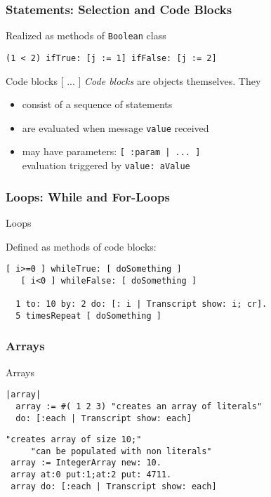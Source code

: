 \documentclass{beamer}
\newcommand{\Blue}[1]{\color{blue}#1\color{black}}
\begin{document}
\begin{frame}[fragile]
\frametitle{Statements: Selection and Code Blocks}

Realized as methods of \texttt{Boolean} class

\begin{lstlisting}[language=Smalltalk]
  (1 < 2) ifTrue: [j := 1] ifFalse: [j := 2]
\end{lstlisting} 

\pause\medskip

\begin{block}{Code blocks [ ... ]}
\emph{Code blocks} are objects themselves. They
\begin{itemize}
  \item consist of a sequence of statements
  \item are evaluated when message \texttt{value} received
  \item may have parameters: 
    \lstinline[language=Smalltalk]{[ :param | ... ]} \\
    evaluation triggered by \texttt{value: aValue}
\end{itemize}

\end{block}


\end{frame}


\begin{frame}[fragile]
\frametitle{Loops: While and For-Loops}

\Blue{Loops}\medskip

Defined as methods of code blocks:

\begin{lstlisting}[language=Smalltalk]
   [ i>=0 ] whileTrue: [ doSomething ]
   [ i<0 ] whileFalse: [ doSomething ]

  1 to: 10 by: 2 do: [: i | Transcript show: i; cr].
  5 timesRepeat [ doSomething ]   
\end{lstlisting} 

\end{frame}


\begin{frame}[fragile]
\frametitle{Arrays}

\Blue{Arrays}\medskip

\begin{lstlisting}[language=Smalltalk]
|array| 
  array := #( 1 2 3) "creates an array of literals"
  do: [:each | Transcript show: each] 
\end{lstlisting} 



\begin{lstlisting}[language=Smalltalk]
 "creates array of size 10;"
     "can be populated with non literals"
 array := IntegerArray new: 10. 
 array at:0 put:1;at:2 put: 4711.
 array do: [:each | Transcript show: each] 
  
\end{lstlisting} 

\end{frame}
\end{document}
